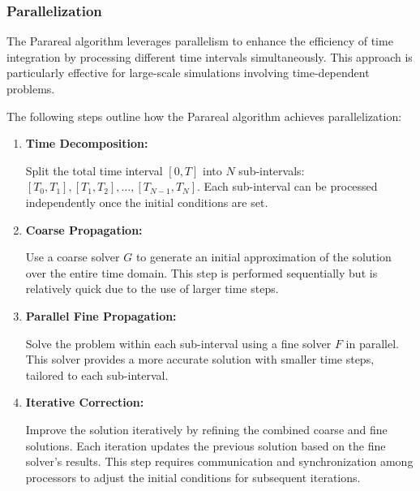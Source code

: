\documentclass[a4paper,12pt,french]{article}
\begin{document}
\subsubsection{Parallelization}
The Parareal algorithm leverages parallelism to enhance the efficiency of time integration by processing different time intervals simultaneously. This approach is particularly effective for large-scale simulations involving time-dependent problems. 

The following steps outline how the Parareal algorithm achieves parallelization:
\begin{enumerate}
    \item \textbf{Time Decomposition:} 
    
        Split the total time interval \([0, T]\) into \(N\) sub-intervals: \([T_0, T_1], [T_1, T_2], ..., [T_{N-1}, T_N]\). Each sub-interval can be processed independently once the initial conditions are set.
    \item \textbf{Coarse Propagation:} 
    
        Use a coarse solver \(G\) to generate an initial approximation of the solution over the entire time domain. This step is performed sequentially but is relatively quick due to the use of larger time steps.
    \item \textbf{Parallel Fine Propagation:} 
    
        Solve the problem within each sub-interval using a fine solver \(F\) in parallel. This solver provides a more accurate solution with smaller time steps, tailored to each sub-interval.
    \item \textbf{Iterative Correction:}  
    
        Improve the solution iteratively by refining the combined coarse and fine solutions. Each iteration updates the previous solution based on the fine solver’s results. This step requires communication and synchronization among processors to adjust the initial conditions for subsequent iterations.
\end{enumerate}
\end{document}
